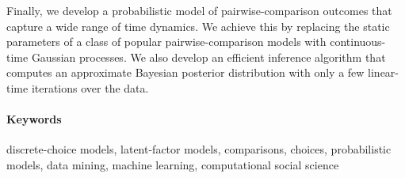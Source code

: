 Finally, we develop a probabilistic model of pairwise-comparison outcomes that capture a wide range of time dynamics.
We achieve this by replacing the static parameters of a class of popular pairwise-comparison models with continuous-time Gaussian processes.
We also develop an efficient inference algorithm that computes an approximate Bayesian posterior distribution with only a few linear-time iterations over the data.


\paragraph{Keywords}
discrete-choice models, latent-factor models, comparisons, choices, probabilistic models, data mining, machine learning, computational social science

\cleardoublepage

